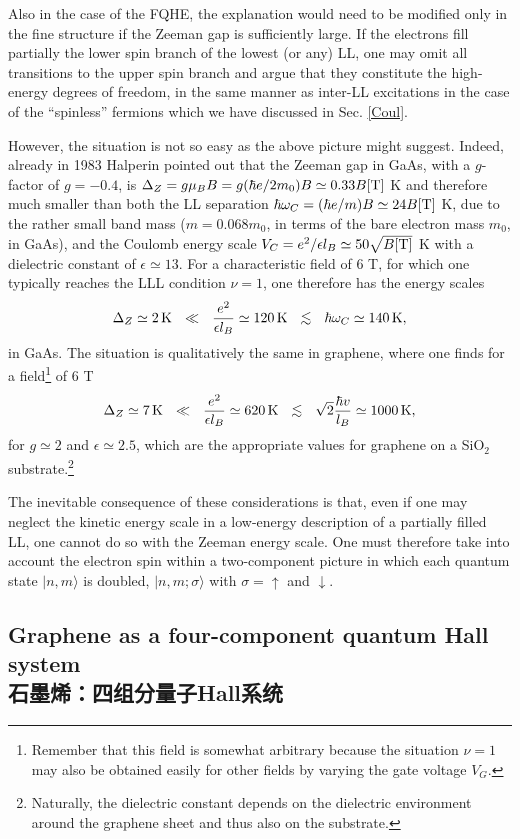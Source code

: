 \documentclass[10pt]{book}
\def\lesssim{\mathrel{\raise.4ex\hbox{$<$}\kern-0.8em\lower.7ex\hbox{$\sim$}}}
\newcommand{\ua}{\uparrow}
\newcommand{\da}{\downarrow}
\newcommand{\beq}{\begin{equation}}
\newcommand{\eeq}{\end{equation}}
\begin{document}
Also in the case of the FQHE, the explanation would need to be modified only in the fine structure
if the Zeeman gap is sufficiently large. If the electrons fill partially the lower spin branch of the lowest (or any) LL,
one may omit all transitions to the upper spin branch and argue that they constitute the high-energy degrees of freedom,
in the same manner as inter-LL excitations in the case of the ``spinless'' fermions which we have discussed in Sec.
\ref{Coul}.

However, the situation is not so easy as the above picture might suggest. Indeed, already in 1983 Halperin pointed out
\cite{halperin83}
that the Zeeman gap in GaAs, with a $g$-factor of $g=-0.4$, is $\Delta_Z =g\mu_B B=g(\hbar e/2m_0)B\simeq 0.33 B{\rm [T]}$ K 
and therefore much smaller
than both the LL separation $\hbar\omega_C=(\hbar e/m) B\simeq 24 B {\rm [T]}$ K, 
due to the rather small band mass ($m=0.068 m_0$, in terms
of the bare electron mass $m_0$, in GaAs), and the Coulomb energy scale $V_C
=e^2/\epsilon l_B\simeq 50 \sqrt{B {\rm [T]}}$ K with a dielectric
constant of $\epsilon\simeq 13$. For a 
characteristic field of 6 T, for which one typically reaches the LLL condition $\nu=1$, one therefore has the energy scales
\beq\label{EnScalesGaAs}
\Delta_Z\simeq 2\,{\rm K} ~~ \ll ~~ \frac{e^2}{\epsilon l_B}\simeq 120\,{\rm K} ~~ \lesssim ~~ \hbar\omega_C \simeq 140\, {\rm K},
\eeq
in GaAs. The situation is qualitatively the same in graphene, where one finds for a field\footnote{Remember that
this field is somewhat arbitrary because the situation $\nu=1$ may also be obtained easily for other fields by varying
the gate voltage $V_G$.} of 6 T
\beq\label{EnScalesGraph}
\Delta_Z\simeq 7\, {\rm K} ~~ \ll ~~ \frac{e^2}{\epsilon l_B}\simeq 620\, {\rm K} ~~ \lesssim ~~ \sqrt{2}\frac{\hbar v}{l_B} 
\simeq 1000\, {\rm K},
\eeq
for $g\simeq 2$ and $\epsilon \simeq 2.5$, which are the appropriate values for graphene on a SiO$_2$ 
substrate.\footnote{Naturally, the dielectric constant depends on the dielectric environment around the graphene sheet
and thus also on the substrate.}

The inevitable consequence of these considerations is that, even if one may neglect the kinetic energy scale in a 
low-energy description of a partially filled LL, one cannot do so with the Zeeman energy scale. One must therefore
take into account the electron spin within a two-component picture in which each quantum state $|n,m\rangle$ is doubled,
$|n,m;\sigma\rangle$ with $\sigma=\ua$ and $\da$.

\subsection[石墨烯：四组分量子Hall系统]{Graphene as a four-component quantum Hall system\\\bf 石墨烯：四组分量子Hall系统}
\end{document}
